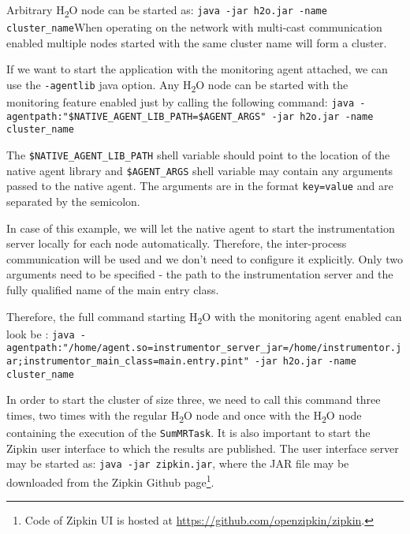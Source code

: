 Arbitrary H\textsubscript{2}O node can be started as: \newline \texttt{java -jar h2o.jar -name cluster\_name}\newline When operating on the network with multi-cast communication enabled multiple nodes started with the same cluster name will form a cluster.

If we want to start the application with the monitoring agent attached, we can use the \texttt{-agentlib} java option. Any H\textsubscript{2}O node can be started with the monitoring feature enabled just by calling the following command: \newline
\texttt{java -agentpath:"\$NATIVE\_AGENT\_LIB\_PATH=\$AGENT\_ARGS" -jar h2o.jar  \newline -name cluster\_name}

The \texttt{\$NATIVE\_AGENT\_LIB\_PATH} shell variable should point to the location of the native agent library and \texttt{\$AGENT\_ARGS} shell variable may contain any arguments passed to the native agent. The arguments are in the format \texttt{key=value} and are separated by the semicolon.

In case of this example, we will let the native agent to start the instrumentation server locally for each node automatically. Therefore, the inter-process communication will be used and we don't need to configure it explicitly. Only two arguments need to be specified - the path to the instrumentation server and the fully qualified name of the main entry class.

Therefore, the full command starting H\textsubscript{2}O with the monitoring agent enabled can look be : \newline
\texttt{java -agentpath:"/home/agent.so=instrumentor\_server\_jar=\newline/home/instrumentor.jar;instrumentor\_main\_class=main.entry.pint" \newline-jar h2o.jar -name cluster\_name}

In order to start the cluster of size three, we need to call this command three times, two times with the regular H\textsubscript{2}O node and once with the H\textsubscript{2}O node containing the execution of the \texttt{SumMRTask}. It is also important to start the Zipkin user interface to which the results are published. The user interface server may be started as: \texttt{java -jar zipkin.jar}, where the JAR file may be downloaded from the Zipkin Github page\footnote{Code of Zipkin UI is hosted at \url{https://github.com/openzipkin/zipkin}.}.
